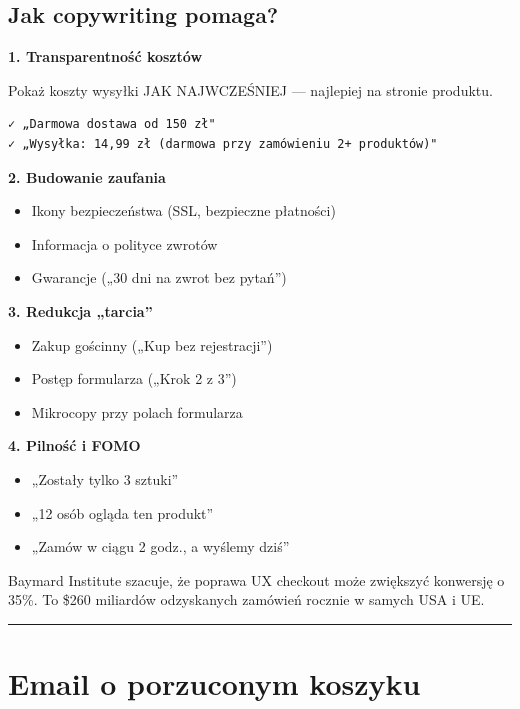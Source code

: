 \documentclass[
  12pt,
  a4paper,
  twoside,
  openright,
  12pt,
  DIV=12,
  BCOR=12mm]{scrbook}
\providecommand{\tightlist}{%
  \setlength{\itemsep}{0pt}\setlength{\parskip}{0pt}}\usepackage{longtable,booktabs,array}
\newcommand{\decoline}{%
  \begin{center}
    \textcolor{bordergray}{\rule{0.3\textwidth}{0.5pt}}
  \end{center}
}
\begin{document}
\subsection{Jak copywriting pomaga?}\label{jak-copywriting-pomaga}

\textbf{1. Transparentność kosztów}

Pokaż koszty wysyłki JAK NAJWCZEŚNIEJ --- najlepiej na stronie produktu.

\begin{verbatim}
✓ „Darmowa dostawa od 150 zł"
✓ „Wysyłka: 14,99 zł (darmowa przy zamówieniu 2+ produktów)"
\end{verbatim}

\textbf{2. Budowanie zaufania}

\begin{itemize}
\tightlist
\item
  Ikony bezpieczeństwa (SSL, bezpieczne płatności)
\item
  Informacja o polityce zwrotów
\item
  Gwarancje („30 dni na zwrot bez pytań'')
\end{itemize}

\textbf{3. Redukcja „tarcia''}

\begin{itemize}
\tightlist
\item
  Zakup gościnny („Kup bez rejestracji'')
\item
  Postęp formularza („Krok 2 z 3'')
\item
  Mikrocopy przy polach formularza
\end{itemize}

\textbf{4. Pilność i FOMO}

\begin{itemize}
\tightlist
\item
  „Zostały tylko 3 sztuki''
\item
  „12 osób ogląda ten produkt''
\item
  „Zamów w ciągu 2 godz., a wyślemy dziś''
\end{itemize}

\begin{wazne}
Baymard Institute szacuje, że poprawa UX checkout może zwiększyć konwersję o 35\%. To \$260 miliardów odzyskanych zamówień rocznie w samych USA i UE.
\end{wazne}

\decoline

\section{Email o porzuconym koszyku}\label{email-o-porzuconym-koszyku}
\end{document}
